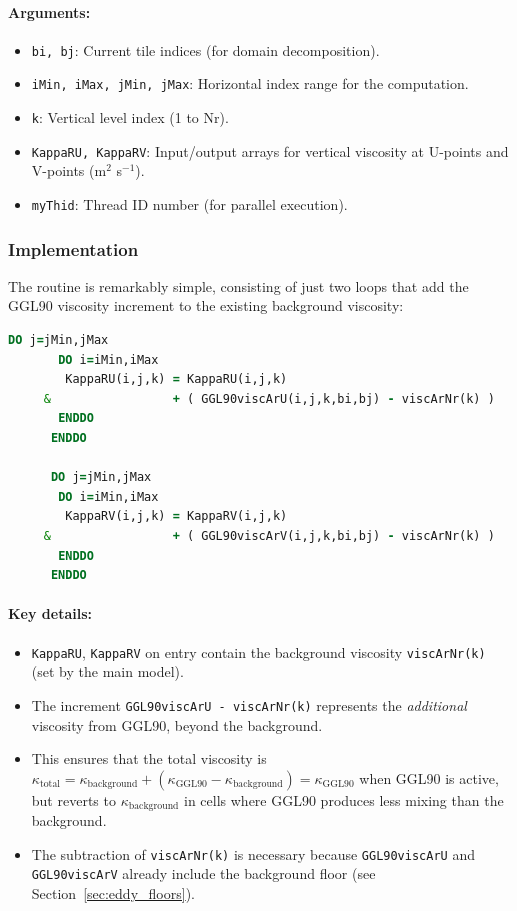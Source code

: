\documentclass[12pt,letterpaper]{article}
\begin{document}
\paragraph{Arguments:}
\begin{itemize}
\item \verb|bi, bj|: Current tile indices (for domain decomposition).
\item \verb|iMin, iMax, jMin, jMax|: Horizontal index range for the computation.
\item \verb|k|: Vertical level index (1 to Nr).
\item \verb|KappaRU, KappaRV|: Input/output arrays for vertical viscosity at U-points and V-points (m$^2$ s$^{-1}$).
\item \verb|myThid|: Thread ID number (for parallel execution).
\end{itemize}

\subsubsection{Implementation}

The routine is remarkably simple, consisting of just two loops that add the GGL90 viscosity increment to the existing background viscosity:

\begin{lstlisting}[language=Fortran,caption={(ggl90\_calc\_visc.F:L47--59) Add GGL90 viscosity to momentum arrays}]
      DO j=jMin,jMax
       DO i=iMin,iMax
        KappaRU(i,j,k) = KappaRU(i,j,k)
     &                 + ( GGL90viscArU(i,j,k,bi,bj) - viscArNr(k) )
       ENDDO
      ENDDO

      DO j=jMin,jMax
       DO i=iMin,iMax
        KappaRV(i,j,k) = KappaRV(i,j,k)
     &                 + ( GGL90viscArV(i,j,k,bi,bj) - viscArNr(k) )
       ENDDO
      ENDDO
\end{lstlisting}

\paragraph{Key details:}
\begin{itemize}
\item \verb|KappaRU|, \verb|KappaRV| on entry contain the background viscosity \verb|viscArNr(k)| (set by the main model).
\item The increment \verb|GGL90viscArU - viscArNr(k)| represents the \emph{additional} viscosity from GGL90, beyond the background.
\item This ensures that the total viscosity is $\kappa_{\text{total}} = \kappa_{\text{background}} + (\kappa_{\text{GGL90}} - \kappa_{\text{background}}) = \kappa_{\text{GGL90}}$ when GGL90 is active, but reverts to $\kappa_{\text{background}}$ in cells where GGL90 produces less mixing than the background.
\item The subtraction of \verb|viscArNr(k)| is necessary because \verb|GGL90viscArU| and \verb|GGL90viscArV| already include the background floor (see Section~\ref{sec:eddy_floors}).
\end{itemize}
\end{document}
